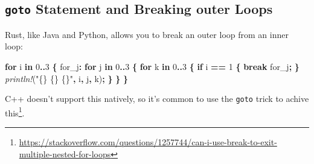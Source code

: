 \documentclass[
]{book}
\newenvironment{Shaded}{\begin{snugshade}}{\end{snugshade}}
\newcommand{\DecValTok}[1]{\textcolor[rgb]{0.00,0.00,0.81}{#1}}
\newcommand{\KeywordTok}[1]{\textcolor[rgb]{0.13,0.29,0.53}{\textbf{#1}}}
\newcommand{\NormalTok}[1]{#1}
\newcommand{\OperatorTok}[1]{\textcolor[rgb]{0.81,0.36,0.00}{\textbf{#1}}}
\newcommand{\OtherTok}[1]{\textcolor[rgb]{0.56,0.35,0.01}{#1}}
\newcommand{\PreprocessorTok}[1]{\textcolor[rgb]{0.56,0.35,0.01}{\textit{#1}}}
\newcommand{\StringTok}[1]{\textcolor[rgb]{0.31,0.60,0.02}{#1}}
\begin{document}
\hypertarget{goto-statement-and-breaking-outer-loops}{%
\subsection{\texorpdfstring{\texttt{goto} Statement and Breaking outer Loops}{goto Statement and Breaking outer Loops}}\label{goto-statement-and-breaking-outer-loops}}

Rust, like Java and Python, allows you to break an outer loop from an inner loop:

\begin{Shaded}
\begin{Highlighting}[]
\KeywordTok{for}\NormalTok{ i }\KeywordTok{in} \DecValTok{0}\OperatorTok{..}\DecValTok{3} \OperatorTok{\{}
    \OtherTok{\textquotesingle{}for\_j}\OperatorTok{:} \KeywordTok{for}\NormalTok{ j }\KeywordTok{in} \DecValTok{0}\OperatorTok{..}\DecValTok{3} \OperatorTok{\{}
        \KeywordTok{for}\NormalTok{ k }\KeywordTok{in} \DecValTok{0}\OperatorTok{..}\DecValTok{3} \OperatorTok{\{}
            \KeywordTok{if}\NormalTok{ i }\OperatorTok{==} \DecValTok{1} \OperatorTok{\{}
                \KeywordTok{break} \OtherTok{\textquotesingle{}for\_j}\OperatorTok{;}
            \OperatorTok{\}}
            \PreprocessorTok{println!}\NormalTok{(}\StringTok{"\{\} \{\} \{\}"}\OperatorTok{,}\NormalTok{ i}\OperatorTok{,}\NormalTok{ j}\OperatorTok{,}\NormalTok{ k)}\OperatorTok{;}
        \OperatorTok{\}}
    \OperatorTok{\}}
\OperatorTok{\}}
\end{Highlighting}
\end{Shaded}

C++ doesn't support this natively, so it's common to use the \texttt{goto} trick to achive this\footnote{\url{https://stackoverflow.com/questions/1257744/can-i-use-break-to-exit-multiple-nested-for-loops}}.
\end{document}

